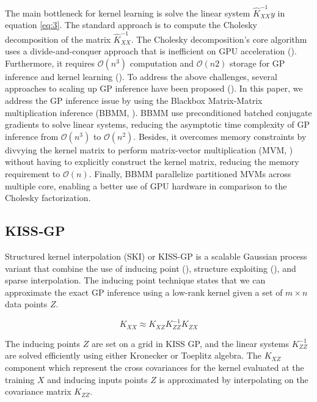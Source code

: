 \documentclass[a4paper, nobind]{templates/cdethesis}
\begin{document}
The main bottleneck for kernel learning is solve the linear system \(\widehat{K}_{XX}^{-1}y\) in equation \ref{eq:3}. The standard approach is to compute the Cholesky decomposition of the matrix \(\widehat{K}_{XX}^{-1}\). The Cholesky decomposition's core algorithm uses a divide-and-conquer approach that is inefficient on GPU acceleration (\cite{krishnamoorthy2013matrix}). Furthermore, it requires \(\mathcal{O}(n^{3})\) computation and \(\mathcal{O}(n2)\) storage for GP inference and kernel learning (\cite{rasmussen2003gaussian}). To address the above challenges, several approaches to scaling up GP inference have been proposed (\cite{gardner2018gpytorch, cunningham2008fast, dong2017scalable, bach2013sharp, wilson2015thoughts}). In this paper, we address the GP inference issue by using the Blackbox Matrix-Matrix multiplication inference (BBMM, \cite{gardner2018gpytorch}). BBMM use preconditioned batched conjugate gradients to solve linear systems, reducing the asymptotic time complexity of GP inference from \(\mathcal{O}(n^{3})\) to \(\mathcal{O}(n^{2})\). Besides, it overcomes memory constraints by divvying the kernel matrix to perform matrix-vector multiplication (MVM, \cite{demmel1997applied}) without having to explicitly construct the kernel matrix, reducing the memory requirement to \(\mathcal{O}(n)\). Finally, BBMM parallelize partitioned MVMs across multiple core, enabling a better use of GPU hardware in comparison to the Cholesky factorization.

\subsection{KISS‑GP}

Structured kernel interpolation (SKI) or KISS-GP is a scalable Gaussian process variant that combine the use of inducing point (\cite{williams2000using}), structure exploiting (\cite{wilson2014covariance}), and sparse interpolation. The inducing point technique states that we can approximate the exact GP inference using a low-rank kernel given a set of \(m \times n\) data points \(Z\).

\begin{equation}
K_{XX} \approx K_{XZ}K_{ZZ}^{-1}K_{ZX}
\label{eq:kiss_01}
\end{equation}

The inducing points \(Z\) are set on a grid in KISS GP, and the linear systems \(K_{ZZ}^{-1}\) are solved efficiently using either Kronecker or Toeplitz algebra. The \(K_{XZ}\) component which represent the cross covariances for the kernel evaluated at the training \(X\) and inducing inputs points \(Z\) is approximated by interpolating on the covariance matrix \(K_{ZZ}\).
\end{document}
